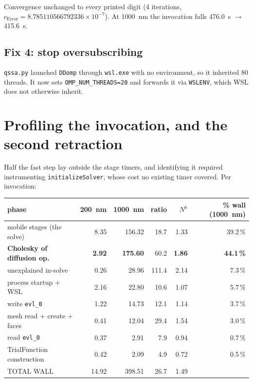 \documentclass[11pt]{article}
\begin{document}
Convergence unchanged to every printed digit (4 iterations,
$c_{\mathrm{Error}} = 8.785110566792336\times10^{-7}$). At
\SI{1000}{\nano\meter} the invocation falls \SI{476.0}{\second} $\rightarrow$
\SI{415.6}{\second}.

\subsection{Fix 4: stop oversubscribing}
\texttt{qssa.py} launched \texttt{DDomp} through \texttt{wsl.exe} with no
environment, so it inherited 80 threads. It now sets
\texttt{OMP\_NUM\_THREADS=20} and forwards it via \texttt{WSLENV}, which WSL
does not otherwise inherit.

\section{Profiling the invocation, and the second retraction}
\label{sec:retract2}
Half the fast step lay outside the stage timers, and identifying it required
instrumenting \texttt{initializeSolver}, whose cost no existing timer covered.
Per invocation:

\begin{center}
\begin{tabular}{lrrrrr}
\toprule
phase & \SI{200}{\nano\meter} & \SI{1000}{\nano\meter} & ratio & $N^k$ & \% wall (\SI{1000}{\nano\meter})\\
\midrule
mobile stages (the solve) & 8.35 & 156.32 & 18.7 & 1.33 & 39.2\,\%\\
\rowcolor{yellow!25}
\textbf{Cholesky of diffusion op.} & \textbf{2.92} & \textbf{175.60} & 60.2 & \textbf{1.86} & \textbf{44.1\,\%}\\
unexplained in-solve & 0.26 & 28.96 & 111.4 & 2.14 & 7.3\,\%\\
process startup + WSL & 2.16 & 22.80 & 10.6 & 1.07 & 5.7\,\%\\
write \texttt{evl\_0} & 1.22 & 14.73 & 12.1 & 1.14 & 3.7\,\%\\
mesh read + create + faces & 0.41 & 12.04 & 29.4 & 1.54 & 3.0\,\%\\
read \texttt{evl\_0} & 0.37 & 2.91 & 7.9 & 0.94 & 0.7\,\%\\
TrialFunction construction & 0.42 & 2.09 & 4.9 & 0.72 & 0.5\,\%\\
\midrule
TOTAL WALL & 14.92 & 398.51 & 26.7 & 1.49 & \\
\bottomrule
\end{tabular}
\end{center}
\end{document}
